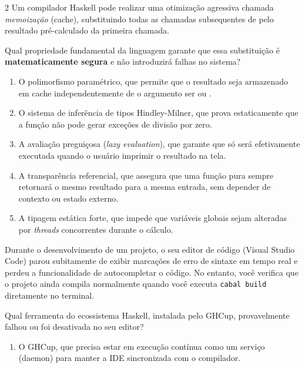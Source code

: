 \documentclass[a4paper,10pt,brazil]{article}
\begin{document}
\begin{multicols}{2}
Um compilador Haskell pode realizar uma otimização agressiva chamada \emph{memoização} (cache), substituindo todas as chamadas subsequentes de  pelo resultado pré-calculado da primeira chamada. 

Qual propriedade fundamental da linguagem garante que essa substituição é \textbf{matematicamente segura} e não introduzirá falhas no sistema?

\begin{enumerate}
  \item O polimorfismo paramétrico, que permite que o resultado seja armazenado em cache independentemente de o argumento ser  ou .

  \item O sistema de inferência de tipos Hindley-Milner, que prova estaticamente que a função não pode gerar exceções de divisão por zero.

  \item A avaliação preguiçosa (\emph{lazy evaluation}), que garante que  só será efetivamente executada quando o usuário imprimir o resultado na tela.

  \item A transparência referencial, que assegura que uma função pura sempre retornará o mesmo resultado para a mesma entrada, sem depender de contexto ou estado externo.

  \item A tipagem estática forte, que impede que variáveis globais sejam alteradas por \textit{threads} concorrentes durante o cálculo.


\end{enumerate}

Durante o desenvolvimento de um projeto, o seu editor de código (Visual Studio Code) parou subitamente de exibir marcações de erro de sintaxe em tempo real e perdeu a funcionalidade de autocompletar o código. No entanto, você verifica que o projeto ainda compila normalmente quando você executa \texttt{cabal build} diretamente no terminal. 

Qual ferramenta do ecossistema Haskell, instalada pelo GHCup, provavelmente falhou ou foi desativada no seu editor?

\begin{enumerate}
  \item O GHCup, que precisa estar em execução contínua como um serviço (daemon) para manter a IDE sincronizada com o compilador.


\end{enumerate}
\end{multicols}
\end{document}

